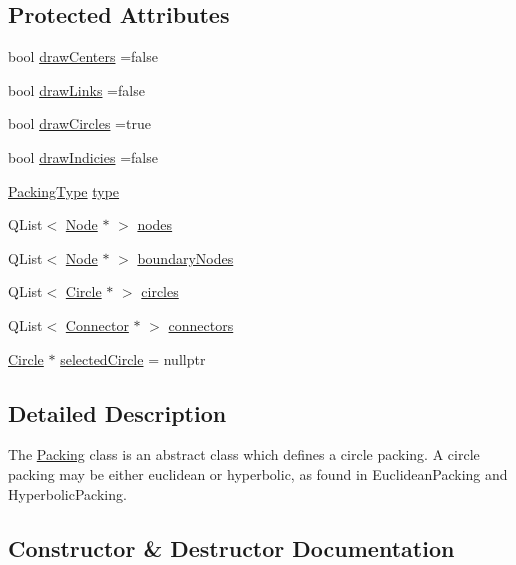 \subsection*{Protected Attributes}
\begin{DoxyCompactItemize}
\item 
bool \hyperlink{class_packing_a147cc720a45cfe1a2ba9cb6a7572ea3c}{draw\+Centers} =false
\item 
bool \hyperlink{class_packing_a4280a02b5e8abf0a2ede10d9336d4656}{draw\+Links} =false
\item 
bool \hyperlink{class_packing_ad747edc67473a43bd84e883f236cc541}{draw\+Circles} =true
\item 
bool \hyperlink{class_packing_addbff5291338fd9db7b30643f162e5fd}{draw\+Indicies} =false
\item 
\hyperlink{graphics_2_packing_8hpp_a331874350131c9e1039dac50b427f8b9}{Packing\+Type} \hyperlink{class_packing_a934cbe1ef81173f5e7fbabf9846d16e2}{type}
\item 
Q\+List$<$ \hyperlink{class_node}{Node} $\ast$ $>$ \hyperlink{class_packing_afee4e76e75aea147685840e19c714d08}{nodes}
\item 
Q\+List$<$ \hyperlink{class_node}{Node} $\ast$ $>$ \hyperlink{class_packing_a5b34c744eb2032be00bee06064fbb9d6}{boundary\+Nodes}
\item 
Q\+List$<$ \hyperlink{class_circle}{Circle} $\ast$ $>$ \hyperlink{class_packing_a60d1a498ccedd7c939ec9fb7e681fbaa}{circles}
\item 
Q\+List$<$ \hyperlink{class_connector}{Connector} $\ast$ $>$ \hyperlink{class_packing_aaad204ad5222b559bc1515308eb2a275}{connectors}
\item 
\hyperlink{class_circle}{Circle} $\ast$ \hyperlink{class_packing_a95c44cf9bb1c33f5b4292b970dfe58d8}{selected\+Circle} = nullptr
\end{DoxyCompactItemize}


\subsection{Detailed Description}
The \hyperlink{class_packing}{Packing} class is an abstract class which defines a circle packing. A circle packing may be either euclidean or hyperbolic, as found in Euclidean\+Packing and Hyperbolic\+Packing. 

\subsection{Constructor \& Destructor Documentation}
\hypertarget{class_packing_afc2e978d83701a4f45cf4c3a397d669d}{}
